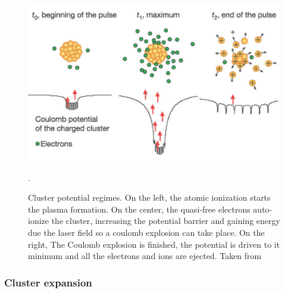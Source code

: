 \begin{figure}[h!] \label{img:clusterpotential}

\centering
\includegraphics[scale=0.35]{../Images/clusterpotential.PNG}
\caption[Cluster potential regimes]{Cluster potential regimes. On the left, the atomic ionization starts the plasma formation. On the center, the quasi-free electrons auto-ionize the cluster, increasing the potential barrier and gaining energy due the laser field so a coulomb explosion can take place. On the right, The Coulomb explosion is finished, the potential is driven to it minimum and all the electrons and ions are ejected. Taken from \cite{wabnitz_multiple_2002}}.
\label{img:clusterpotential}
\end{figure}

\subsubsection{Cluster expansion}

